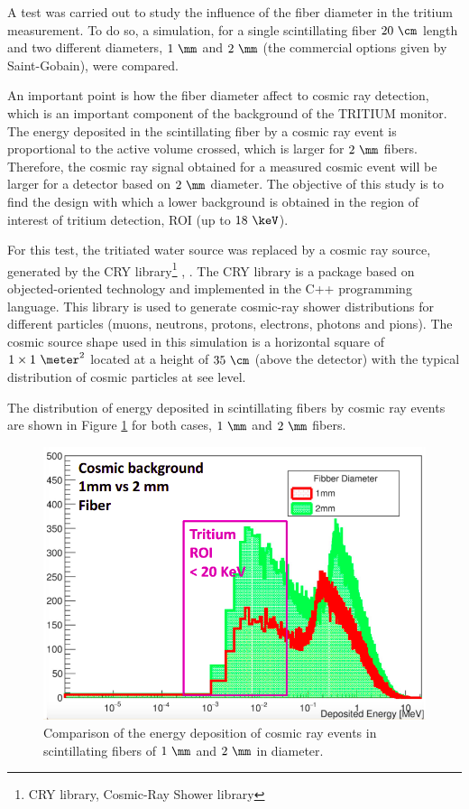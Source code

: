 A test was carried out to study the influence of the fiber diameter in the tritium measurement. To do so, a simulation, for a single scintillating fiber $20~\cm$ length and two different diameters, $1~\mm$ and $2~\mm$ (the commercial options given by Saint-Gobain), were compared.

An important point is how the fiber diameter affect to cosmic ray detection, which is an important component of the background of the TRITIUM monitor. The energy deposited in the scintillating fiber by a cosmic ray event is proportional to the active volume crossed, which is larger for $2~\mm$ fibers. Therefore, the cosmic ray signal obtained for a measured cosmic event will be larger for a detector based on $2~\mm$ diameter. The objective of this study is to find the design with which a lower background is obtained in the region of interest of tritium detection, ROI (up to $18~\keV$).

For this test, the tritiated water source was replaced by a cosmic ray source, generated by the CRY library\footnote{CRY library, Cosmic-Ray Shower library} \cite{CRYwebsite}, \cite{CRYpaper}. The CRY library is a package based on objected-oriented technology and implemented in the C++ programming language. This library is used to generate cosmic-ray shower distributions for different particles (muons, neutrons, protons, electrons, photons and pions). The cosmic source shape used in this simulation is a horizontal square of $1 \times 1~\meter ^2$ located at a height of $35~\cm$ (above the detector) with the typical distribution of cosmic particles at see level. 

The distribution of energy deposited in scintillating fibers by cosmic ray events are shown in Figure \ref{fig:DiameterComparison} for both cases, $1~\mm$ and $2~\mm$ fibers.

\begin{figure}[hbtp]
\centering
\includegraphics[scale=0.4]{Figures/8SimulationsResults/81TRITIUMDesign/814Diameter/ComparisonDiameter.png}
\caption{Comparison of the energy deposition of cosmic ray events in scintillating fibers of $1~\mm$ and $2~\mm$ in diameter.\label{fig:DiameterComparison}}
\end{figure}

